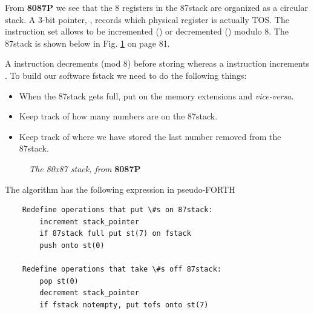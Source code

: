 From \textbf{8087P} we see that the 8 registers in the 87stack are organized as a circular stack. A 3-bit pointer, , records which physical register is actually TOS. The instruction set allows  to be incremented () or decremented () modulo 8. The 87stack is shown below in Fig. \ref{fig:04_01} on page 81.

A  instruction decrements  (mod 8) before storing whereas a  instruction increments . To build our software fstack we need to do the following things:
\begin{itemize}
    \item When the 87stack gets full, put  on the memory extensions and \textit{vice-versa}.
    \item Keep track of how many numbers are on the 87stack.
    \item Keep track of where we have stored the last number removed from the 87stack.
\end{itemize}

\begin{figure}
    \center
    \caption{\textit{The 80x87 stack, from} \textbf{8087P}}
    \label{fig:04_01}
\end{figure}

The algorithm has the following expression in pseudo-FORTH

\begin{lstlisting}
    Redefine operations that put \#s on 87stack:
        increment stack_pointer
        if 87stack full put st(7) on fstack
        push onto st(0)

    Redefine operations that take \#s off 87stack:
        pop st(0)
        decrement stack_pointer
        if fstack notempty, put tofs onto st(7)
\end{lstlisting}

